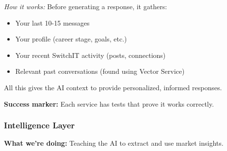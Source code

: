 \documentclass[12pt,a4paper]{article}
\begin{document}
\begin{enumerate}
  \textit{How it works:} Before generating a response, it gathers:
  \begin{itemize}
    \item Your last 10-15 messages
    \item Your profile (career stage, goals, etc.)
    \item Your recent SwitchIT activity (posts, connections)
    \item Relevant past conversations (found using Vector Service)
  \end{itemize}

  All this gives the AI context to provide personalized, informed responses.
\end{enumerate}

\textbf{Success marker:} Each service has tests that prove it works correctly.

\subsubsection{Intelligence Layer }

\textbf{What we're doing:} Teaching the AI to extract and use market insights.
\end{document}
